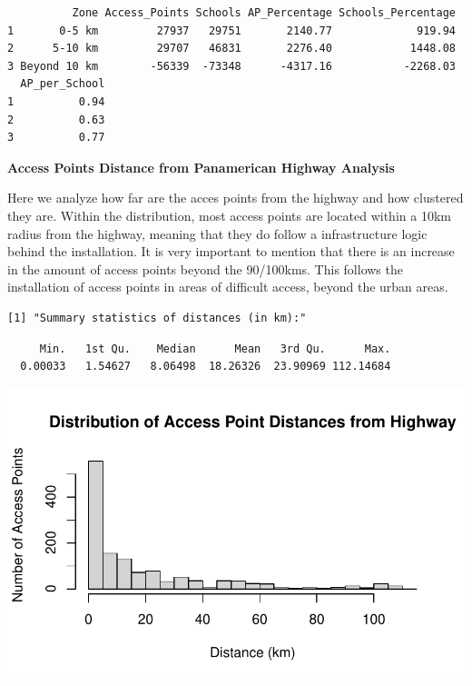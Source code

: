 \documentclass[
  letterpaper,
  DIV=11,
  numbers=noendperiod]{scrartcl}
\begin{document}
\begin{verbatim}
          Zone Access_Points Schools AP_Percentage Schools_Percentage
1       0-5 km         27937   29751       2140.77             919.94
2      5-10 km         29707   46831       2276.40            1448.08
3 Beyond 10 km        -56339  -73348      -4317.16           -2268.03
  AP_per_School
1          0.94
2          0.63
3          0.77
\end{verbatim}

\textbf{Access Points Distance from Panamerican Highway Analysis}

Here we analyze how far are the acces points from the highway and how
clustered they are. Within the distribution, most access points are
located within a 10km radius from the highway, meaning that they do
follow a infrastructure logic behind the installation. It is very
important to mention that there is an increase in the amount of access
points beyond the 90/100kms. This follows the installation of access
points in areas of difficult access, beyond the urban areas.

\begin{verbatim}
[1] "Summary statistics of distances (in km):"
\end{verbatim}

\begin{verbatim}
     Min.   1st Qu.    Median      Mean   3rd Qu.      Max. 
  0.00033   1.54627   8.06498  18.26326  23.90969 112.14684 
\end{verbatim}

\includegraphics{index_files/figure-pdf/highway-distances-1.pdf}
\end{document}
